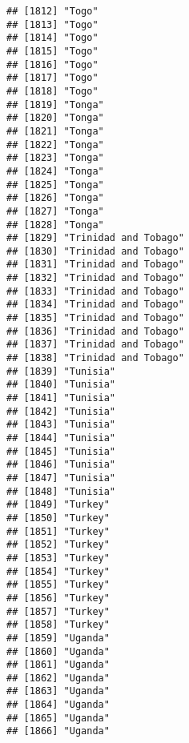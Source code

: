 \documentclass[]{article}
\begin{document}
\begin{verbatim}
## [1812] "Togo"                               
## [1813] "Togo"                               
## [1814] "Togo"                               
## [1815] "Togo"                               
## [1816] "Togo"                               
## [1817] "Togo"                               
## [1818] "Togo"                               
## [1819] "Tonga"                              
## [1820] "Tonga"                              
## [1821] "Tonga"                              
## [1822] "Tonga"                              
## [1823] "Tonga"                              
## [1824] "Tonga"                              
## [1825] "Tonga"                              
## [1826] "Tonga"                              
## [1827] "Tonga"                              
## [1828] "Tonga"                              
## [1829] "Trinidad and Tobago"                
## [1830] "Trinidad and Tobago"                
## [1831] "Trinidad and Tobago"                
## [1832] "Trinidad and Tobago"                
## [1833] "Trinidad and Tobago"                
## [1834] "Trinidad and Tobago"                
## [1835] "Trinidad and Tobago"                
## [1836] "Trinidad and Tobago"                
## [1837] "Trinidad and Tobago"                
## [1838] "Trinidad and Tobago"                
## [1839] "Tunisia"                            
## [1840] "Tunisia"                            
## [1841] "Tunisia"                            
## [1842] "Tunisia"                            
## [1843] "Tunisia"                            
## [1844] "Tunisia"                            
## [1845] "Tunisia"                            
## [1846] "Tunisia"                            
## [1847] "Tunisia"                            
## [1848] "Tunisia"                            
## [1849] "Turkey"                             
## [1850] "Turkey"                             
## [1851] "Turkey"                             
## [1852] "Turkey"                             
## [1853] "Turkey"                             
## [1854] "Turkey"                             
## [1855] "Turkey"                             
## [1856] "Turkey"                             
## [1857] "Turkey"                             
## [1858] "Turkey"                             
## [1859] "Uganda"                             
## [1860] "Uganda"                             
## [1861] "Uganda"                             
## [1862] "Uganda"                             
## [1863] "Uganda"                             
## [1864] "Uganda"                             
## [1865] "Uganda"                             
## [1866] "Uganda"                             

\end{verbatim}
\end{document}

